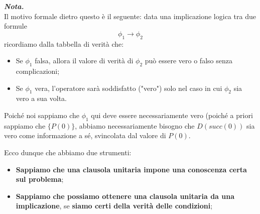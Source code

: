 \documentclass[a4paper,10pt]{article}
\begin{document}
\begin{osservazioni}
    \textit{\textbf{Nota.}}\\
    Il motivo formale dietro questo è il seguente: data una implicazione logica tra due formule
    $$\phi_1\rightarrow \phi_2$$
    ricordiamo dalla tabbella di verità che:
    \begin{itemize}
        \item Se $\phi_1$ falsa, allora il valore di verità di $\phi_2$ può essere vero o falso senza complicazioni;
        \item Se $\phi_1$ vera, l'operatore sarà soddisfatto ("vero") solo nel caso in cui $\phi_2$ sia vero a sua volta.
    \end{itemize}
    Poiché noi sappiamo che $\phi_1$ qui deve essere necessariamente vero (poiché a priori sappiamo che $\{P(0)\}$, abbiamo necessariamente bisogno che $D(succ(0))$ sia vero come informazione a sé, svincolata dal valore di $P(0)$.
\end{osservazioni}

Ecco dunque che abbiamo due strumenti:
\begin{itemize}
    \item \textbf{Sappiamo che una clausola unitaria impone una conoscenza certa sul problema};
    \item \textbf{Sappiamo che possiamo ottenere una clausola unitaria da una implicazione}, se \textbf{siamo certi della verità delle condizioni};\\
\end{itemize}
\end{document}
